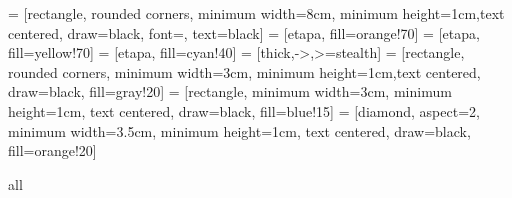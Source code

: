 \usepackage[utf8]{inputenc}
\usepackage{subfigure}
\usepackage{xcolor}
\usepackage{minted}
\usepackage[spanish]{babel}
\usepackage{amsmath,amssymb,amsfonts}		
\usepackage{booktabs}
\usepackage{array}
\usepackage{pdfpages}
\usepackage{graphicx}
\usepackage{forest} 
\usepackage{longtable}
\usepackage{lscape}
\usepackage{tikz} 
\usepackage{geometry} 
\usepackage{multicol} 
\usepackage{tabularx}
\usepackage{adjustbox}

\setlength{\LTpre}{0pt}
\setlength{\LTpost}{0pt}

\renewcommand{\arraystretch}{1.3} %




\usetikzlibrary{shapes.geometric, arrows.meta, positioning}
 = [rectangle, rounded corners, minimum width=8cm, minimum height=1cm,text centered, draw=black, font=\small, text=black]
 = [etapa, fill=orange!70]
 = [etapa, fill=yellow!70]
 = [etapa, fill=cyan!40]
 = [thick,->,>=stealth]
 = [rectangle, rounded corners, minimum width=3cm, minimum height=1cm,text centered, draw=black, fill=gray!20]
 = [rectangle, minimum width=3cm, minimum height=1cm, text centered, draw=black, fill=blue!15]
 = [diamond, aspect=2, minimum width=3.5cm, minimum height=1cm, text centered, draw=black, fill=orange!20]





\newtheorem{notation}{Notación}[chapter]
\newtheorem{theorem}{Teorema}[chapter]
\newtheorem{definition}{Definición}[chapter]
\newtheorem{lemma}{Lema}[chapter]
\graphicspath{{assets/}}
\usepackage{csquotes} 

\usepackage[
    style=apa,
    sortcites=true,
    sorting=nyt,
    backend=biber,
    language=spanish,
    hyperref=true,
    backref=true,
]{biblatex}




\pagestyle{plain}

\def\all{all}
\ifx\files\all {} \else %

